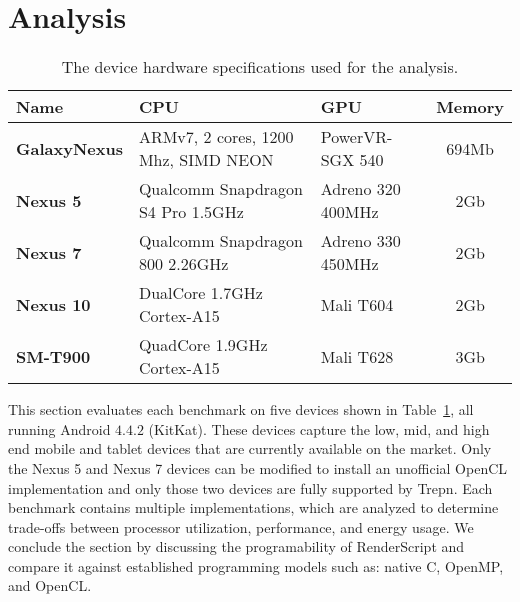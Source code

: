 \section{Analysis}
\label{sec:analysis}


\begin{table}
\centering
\begin{tabular}{ | l | p{2.1cm} | p{1.7cm} | c |}
    \hline 
    Name & CPU & GPU & Memory \\ \hline
    \textbf{GalaxyNexus} & ARMv7, 2 cores, 1200 Mhz, SIMD NEON & PowerVR-SGX 540 & 694Mb \\ \hline
    \textbf{Nexus 5} & Qualcomm Snapdragon S4 Pro 1.5GHz & Adreno 320 400MHz & 2Gb \\ \hline
    \textbf{Nexus 7} & Qualcomm Snapdragon 800 2.26GHz & Adreno 330 450MHz & 2Gb \\ \hline
    \textbf{Nexus 10} & DualCore 1.7GHz Cortex-A15 & Mali T604 & 2Gb \\ \hline
    \textbf{SM-T900} & QuadCore 1.9GHz Cortex-A15 & Mali T628 & 3Gb \\ \hline
    \hline
\end{tabular}
\caption{The device hardware specifications used for the analysis.}
\label{table:hardware}
\end{table}

This section evaluates each benchmark on five devices shown
  in Table~\ref{table:hardware}, all running Android $4.4.2$ (KitKat).
These devices capture the low, mid, and high end mobile and tablet
  devices that are currently available on the market.
Only the Nexus 5 and Nexus 7 devices can be modified to install an
  unofficial OpenCL implementation and only those two devices are fully supported
  by Trepn.
Each benchmark contains multiple implementations, which 
  are analyzed to determine trade-offs between
  processor utilization, performance, and energy usage.
We conclude the section by discussing the programability of RenderScript
  and compare it against established programming models such as:
  native C, OpenMP, and OpenCL.







